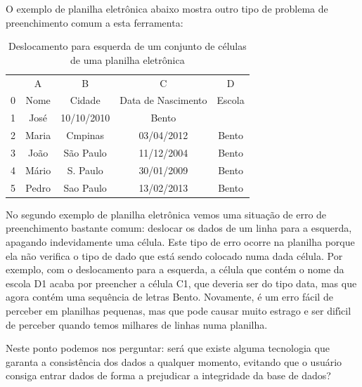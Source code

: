 \documentclass[
12pt,		%
openright,	%
twoside,  %
a4paper,			%
chapter=TITLE,		%
english,			%
french,				%
spanish,			%
brazil				%
]{USPSC-classe/USPSC_RedarTex}
\begin{document}
O exemplo de planilha eletr\^onica abaixo mostra outro tipo de problema de preenchimento comum a esta ferramenta:














\begin{table}[htb]
\tiny
\caption{\label{e3b47bf39da523e9c75b9e6eaca4c9c9461e8099}Deslocamento para esquerda de um conjunto de c\'elulas de uma planilha eletr\^onica}

\centering
\begin{tabular}{|c|c|c|c|c|}
\hline
  &  A  &  B  &  C  &  D  \\
0 & Nome  &  Cidade  &  Data de Nascimento  &  Escola \\
1 & Jos\'e  &  10/10/2010  &  Bento  &   \\
2 & Maria  &  Cmpinas  &  03/04/2012  &  Bento \\
3 & Jo\~ao  &  S\~ao Paulo  &  11/12/2004  &  Bento \\
4 & M\'ario  &  S. Paulo  &  30/01/2009  &  Bento \\
5 & Pedro  &  Sao Paulo  &  13/02/2013  &  Bento \\
\hline
\end{tabular}
\end{table}


No segundo exemplo de planilha eletr\^onica vemos uma situa\c{c}\~ao de erro de preenchimento bastante comum: deslocar os dados de um linha para a esquerda, apagando indevidamente uma c\'elula. Este tipo de erro ocorre na planilha porque ela n\~ao verifica o tipo de dado que est\'a sendo colocado numa dada c\'elula. Por exemplo, com o deslocamento para a esquerda, a c\'elula que cont\'em o nome da escola D1 acaba por preencher a c\'elula C1, que deveria ser do tipo data, mas que agora cont\'em uma sequ\^encia de letras \textquotedbl Bento\textquotedbl . Novamente, \'e um erro f\'acil de perceber em planilhas pequenas, mas que pode causar muito estrago e ser dif\'{\i}cil de perceber quando temos milhares de linhas numa planilha.










Neste ponto podemos nos perguntar: ser\'a que existe alguma tecnologia que garanta a consist\^encia dos dados a qualquer momento, evitando que o usu\'ario consiga entrar dados de forma a prejudicar a integridade da base de dados?
\end{document}
